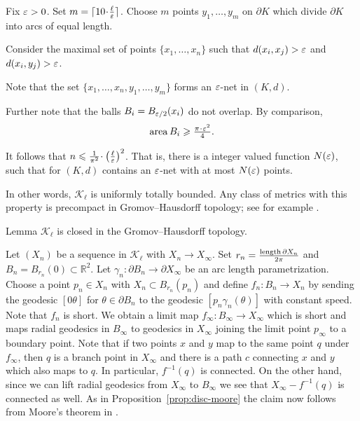 \documentclass{article}
\begin{document}
Fix $\varepsilon>0$. 
Set $m=\lceil 10\cdot\tfrac\ell\eps\rceil$.
Choose $m$ points $y_1,\dots,y_m$ on $\partial K$
which divide $\partial K$ into arcs of equal length.

Consider the maximal set of points $\{x_1,\dots,x_n\}$ such that $d(x_i,x_j)>\varepsilon$ and $d(x_i,y_j)>\varepsilon$.

Note that the set $\{x_1,\dots,x_n,y_1,\dots,y_m\}$
forms an $\varepsilon$-net in $(K,d)$.

Further note that the balls $B_i=B_{\varepsilon/2}(x_i)$
do not overlap.
By comparison,
\[\area B_i\ge \tfrac{\pi\cdot\eps^2}{4}.\]

It follows that $n\le \tfrac{1}{\pi^2}\cdot\left(\tfrac\ell\eps\right)^2$.
That is, there is a integer valued function $N(\varepsilon)$,
such that for  
$(K,d)$ contains an $\varepsilon$-net
with at most $N(\varepsilon)$ points.

In other words, $\mathcal{K}_\ell$ is uniformly totally bounded.
Any class of metrics with this property is precompact in Gromov--Hausdorff topology; 
see for example \cite[7.4.15]{BBI}.
\qeds





\begin{thm}{Lemma}\label{lem:closed}
$\mathcal{K}_\ell$ is closed in the Gromov--Hausdorff topology.
\end{thm}

Let $(X_n)$ be a sequence in $\mathcal{K}_\ell$ with $X_n\to X_\infty$. 
Set $r_n=\frac{\mathop{\rm length}\nolimits\partial X_n}{2\pi}$ 
and $B_n=B_{r_n}(0)\subset \mathbb{R}^2$.
Let $\gamma_n:\partial B_n\to\partial X_\infty$ be an arc length parametrization. Choose a point $p_n\in X_n$ with $X_n\subset B_{r_n}(p_n)$ and define
$f_n:B_n\to X_n$ by sending the geodesic $[0\theta]$ for $\theta\in\partial B_n$ to the geodesic $[p_n\gamma_n(\theta)]$ with constant speed. Note that $f_n$ is short.
We obtain a limit map $f_\infty:B_\infty\to X_\infty$ which is short and maps radial geodesics in $B_\infty$ to geodesics in $X_\infty$ joining the limit point $p_\infty$
to a boundary point. Note that if two points $x$  and $y$ map to the same point $q$ under $f_\infty$, then $q$ is a branch point in $X_\infty$ and there is a path $c$ connecting 
$x$ and $y$ which also maps to $q$. 
In particular, $f^{-1}(q)$ is connected. On the other hand, since we can lift radial geodesics from $X_\infty$ to $B_\infty$ we see that $X_\infty-f^{-1}(q)$
is connected as well. As in Proposition~\ref{prop:disc-moore} the claim now follows from Moore's theorem in \cite{moore}.
\qeds
\end{document}
